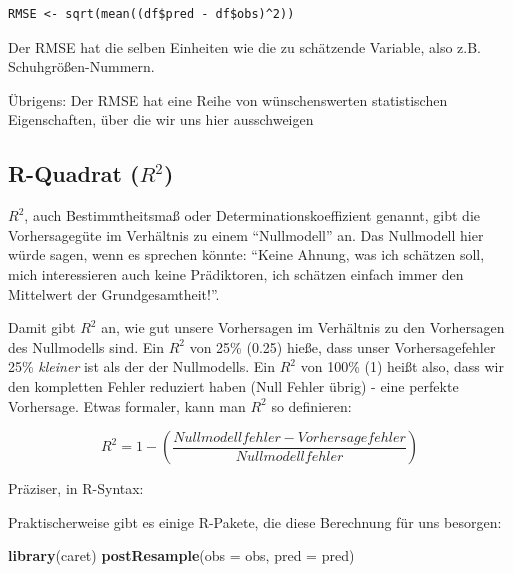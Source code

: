 \documentclass[12pt,ngerman,]{book}
\newenvironment{Shaded}{\begin{snugshade}}{\end{snugshade}}
\newcommand{\KeywordTok}[1]{\textcolor[rgb]{0.13,0.29,0.53}{\textbf{{#1}}}}
\newcommand{\DataTypeTok}[1]{\textcolor[rgb]{0.13,0.29,0.53}{{#1}}}
\newcommand{\DecValTok}[1]{\textcolor[rgb]{0.00,0.00,0.81}{{#1}}}
\newcommand{\StringTok}[1]{\textcolor[rgb]{0.31,0.60,0.02}{{#1}}}
\newcommand{\NormalTok}[1]{{#1}}
\renewenvironment{Shaded}{\begin{kframe}}{\end{kframe}}
\begin{document}
\begin{verbatim}
RMSE <- sqrt(mean((df$pred - df$obs)^2))
\end{verbatim}

Der RMSE hat die selben Einheiten wie die zu schätzende Variable, also
z.B. Schuhgrößen-Nummern.

Übrigens: Der RMSE hat eine Reihe von wünschenswerten statistischen
Eigenschaften, über die wir uns hier ausschweigen

\subsection{\texorpdfstring{R-Quadrat
(\(R^2\))}{R-Quadrat (R\^{}2)}}\label{r-quadrat-r2}

\(R^2\), auch Bestimmtheitsmaß oder Determinationskoeffizient genannt,
gibt die Vorhersagegüte im Verhältnis zu einem ``Nullmodell'' an. Das
Nullmodell hier würde sagen, wenn es sprechen könnte: ``Keine Ahnung,
was ich schätzen soll, mich interessieren auch keine Prädiktoren, ich
schätzen einfach immer den Mittelwert der Grundgesamtheit!''.

Damit gibt \(R^2\) an, wie gut unsere Vorhersagen im Verhältnis zu den
Vorhersagen des Nullmodells sind. Ein \(R^2\) von 25\% (0.25) hieße,
dass unser Vorhersagefehler 25\% \emph{kleiner} ist als der der
Nullmodells. Ein \(R^2\) von 100\% (1) heißt also, dass wir den
kompletten Fehler reduziert haben (Null Fehler übrig) - eine perfekte
Vorhersage. Etwas formaler, kann man \(R^2\) so definieren:

\[ R^2 = 1 - (\frac{Nullmodellfehler - Vorhersagefehler}{Nullmodellfehler})\]

Präziser, in R-Syntax:

\begin{Shaded}
\end{Shaded}

Praktischerweise gibt es einige R-Pakete, die diese Berechnung für uns
besorgen:

\begin{Shaded}
\begin{Highlighting}[]
\KeywordTok{library}\NormalTok{(caret)}
\KeywordTok{postResample}\NormalTok{(}\DataTypeTok{obs =} \NormalTok{obs, }\DataTypeTok{pred =} \NormalTok{pred)}
\end{Highlighting}
\end{Shaded}
\end{document}
